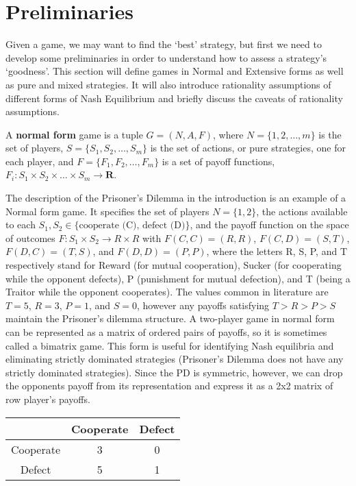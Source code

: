 \chapter{Preliminaries}

Given a game, we may want to find the `best' strategy, but first we need to develop some preliminaries in order to understand how to assess a strategy's `goodness'. This section will define games in Normal and Extensive forms as well as pure and mixed strategies. It will also introduce rationality assumptions of different forms of Nash Equilibrium and briefly discuss the caveats of rationality assumptions.

\begin{definition} A \textbf{normal form} game is a tuple $G = (N, A, F)$, where $N = \{1,2,\dots,m\}$ is the set of players, $S = \{S_1, S_2, \dots, S_m\}$ is the set of actions, or pure strategies, one for each player, and $F = \{F_1, F_2, \dots, F_m\}$ is a set of payoff functions, $F_i \colon S_1 \times S_2 \times \dots \times S_m \rightarrow \mathbf{R}$.
\end{definition}

The description of the Prisoner's Dilemma in the introduction is an example of a Normal form game. It specifies the set of players $N = \{1, 2\}$, the actions available to each $S_1, S_2 \in \{\textrm{cooperate (C), defect (D)}\}$, and the payoff function on the space of outcomes $F \colon S_1 \times S_2 \rightarrow R\times R$ with $F(C,C) = (R, R)$, $F(C, D) = (S, T)$, $F(D, C) = (T,S)$, and $F(D, D) = (P, P)$, where the letters R, S, P, and T respectively stand for Reward (for mutual cooperation), Sucker (for cooperating while the opponent defects), P (punishment for mutual defection), and T (being a Traitor while the opponent cooperates). The values common in literature are $T = 5$, $R = 3$, $P = 1$, and $S = 0$, however any payoffs satisfying $T > R > P > S$ maintain the Prisoner's dilemma structure. A two-player game in normal form can be represented as a matrix of ordered pairs of payoffs, so it is sometimes called a bimatrix game. This form is useful for identifying Nash equilibria and eliminating strictly dominated strategies (Prisoner's Dilemma does not have any strictly dominated strategies). Since the PD is symmetric, however, we can drop the opponents payoff from its representation and express it as a 2x2 matrix of row player's payoffs.

\begin{center}
  \begin{tabular}{ | c | c | c | }
    \hline
    & Cooperate & Defect \\
    \hline
    Cooperate & 3 & 0 \\ \hline
    Defect & 5 & 1  \\ \hline
  \end{tabular}
\end{center}

